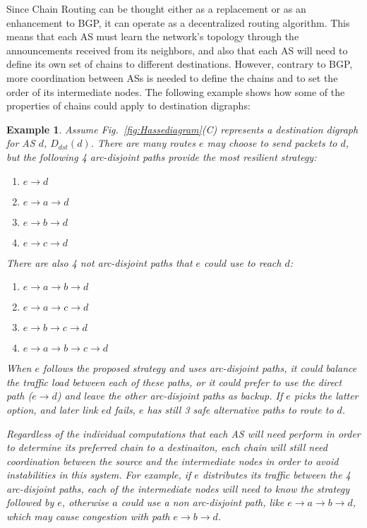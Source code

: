 \documentclass[5p,twocolumn]{elsarticle}
\newtheorem{example}{Example}
\begin{document}
Since Chain Routing can be thought either as a replacement or as an enhancement to BGP, it can operate as a decentralized routing algorithm. This means that each AS must learn the network's topology through the announcements received from its neighbors, and also that each AS will need to define its own set of chains to different destinations. However, contrary to BGP, more coordination between ASs is needed to define the chains and to set the order of its intermediate nodes. The following example shows how some of the properties of chains could apply to destination digraphs:

\begin{example}
Assume Fig.\ \ref{fig:Hassediagram}(C) represents a destination digraph for AS $d$, $D_{dst}(d)$. There are many routes $e$ may choose to send packets to $d$, but the following 4 arc-disjoint paths provide the most resilient strategy:

\begin{enumerate}
	\item $e \rightarrow d$
	\item $e \rightarrow a \rightarrow d$
	\item $e \rightarrow b \rightarrow d$
	\item $e \rightarrow c \rightarrow d$
\end{enumerate}

There are also 4 not arc-disjoint paths that $e$ could use to reach $d$:

\begin{enumerate}
	\item $e \rightarrow a \rightarrow b \rightarrow d$
	\item $e \rightarrow a \rightarrow c \rightarrow d$
	\item $e \rightarrow b \rightarrow c \rightarrow d$
	\item $e \rightarrow a \rightarrow b \rightarrow c \rightarrow d$
\end{enumerate}

When $e$ follows the proposed strategy and uses arc-disjoint paths, it could balance the traffic load between each of these paths, or it could prefer to use the direct path ($e \rightarrow d$) and leave the other arc-disjoint paths as backup. If $e$ picks the latter option, and later link $ed$ fails, $e$ has still 3 safe alternative paths to route to $d$.

Regardless of the individual computations that each AS will need perform in order to determine its preferred chain to a destinaiton, each chain will still need coordination between the source and the intermediate nodes in order to avoid instabilities in this system. For example, if $e$ distributes its traffic between the 4 arc-disjoint paths, each of the intermediate nodes will need to know the strategy followed by $e$, otherwise $a$ could use a non arc-disjoint path, like $e \rightarrow a \rightarrow b \rightarrow d$, which may cause congestion with path $e \rightarrow b \rightarrow d$.
\end{example}
\end{document}
